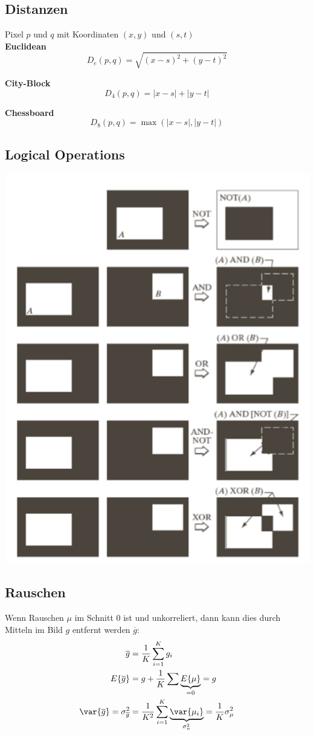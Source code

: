 \subsection{Distanzen}
Pixel $p$ und $q$ mit Koordinaten $(x, y)$ und $(s,t)$~\\


\textbf{Euclidean}
\[
D_e(p, q) = \sqrt{(x-s)^2 + (y-t)^2}
\]

\textbf{City-Block}
\[
D_4(p,q) = \left|x-s\right| + \left|y-t\right|
\]

\textbf{Chessboard}
\[
D_8(p,q) = \max\left(\left|x-s\right|, \left|y-t\right|\right)
\]

\subsection{Logical Operations}
\includegraphics[width=\columnwidth]{Images/logical}

\subsection{Rauschen}
Wenn Rauschen $\mu$ im Schnitt $0$ ist und unkorreliert, dann kann dies durch Mitteln im Bild $g$ entfernt werden $\overline{g}$:
\begin{align*}
	\overline{g} &= \frac{1}{K}\sum_{i=1}^{K}g_i \\
	E\{\overline{g}\} &= g + \frac{1}{K}\sum\underbrace{ E\{\mu\}}_{=0} = g \\
	\var\{\overline{g}\} = \sigma^2_{\overline{g}} &= \frac{1}{K^2}\sum_{i=1}^{K}\underbrace{\var{\mu_i}}_{\sigma^2_n} = \frac{1}{K}\sigma^2_\mu \\
\end{align*}

